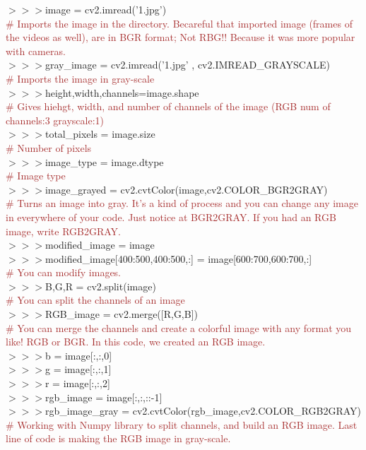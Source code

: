 \documentclass[a4paper,18pt]{article}
\begin{document}
$>>>$image = cv2.imread('1.jpg')\\{\textcolor{brown}{\# Imports the image in the directory. Becareful that imported image (frames of the videos as well), are in BGR format; Not RBG!! Because it was more popular with cameras.}}\\

$>>>$gray\_image = cv2.imread('1.jpg' , cv2.IMREAD\_GRAYSCALE)\\{\textcolor{brown}{\# Imports the image in gray-scale}}\\

$>>>$height,width,channels=image.shape\\{\textcolor{brown}{\# Gives hiehgt, width, and number of channels of the image (RGB num of channels:3 grayscale:1)}}\\

$>>>$total\_pixels = image.size\\{\textcolor{brown}{\# Number of pixels}}\\

$>>>$image\_type = image.dtype\\{\textcolor{brown}{\# Image type}}\\

$>>>$image\_grayed = cv2.cvtColor(image,cv2.COLOR\_BGR2GRAY)\\{\textcolor{brown}{\# Turns an image into gray. It's a kind of process and you can change any image in everywhere of your code. Just notice at BGR2GRAY. If you had an RGB image, write RGB2GRAY.}}\\

$>>>$modified\_image = image\\
\hspace*{14pt}$>>>$modified\_image[400:500,400:500,:] = image[600:700,600:700,:]\\{\textcolor{brown}{\# You can modify images.}}\\

$>>>$B,G,R = cv2.split(image)\\{\textcolor{brown}{\# You can split the channels of an image}}\\

$>>>$RGB\_image = cv2.merge([R,G,B])\\{\textcolor{brown}{\# You can merge the channels and create a colorful image with any format you like! RGB or BGR. In this code, we created an RGB image.}}\\

$>>>$b = image[:,:,0]\\
\hspace*{14pt}$>>>$g = image[:,:,1]\\
\hspace*{14pt}$>>>$r = image[:,:,2]\\
\hspace*{14pt}$>>>$rgb\_image = image[:,:,::-1]\\
\hspace*{14pt}$>>>$rgb\_image\_gray = cv2.cvtColor(rgb\_image,cv2.COLOR\_RGB2GRAY)\\{\textcolor{brown}{\# Working with Numpy library to split channels, and build an RGB image. Last line of code is making the RGB image in gray-scale.}}\\
\end{document}
